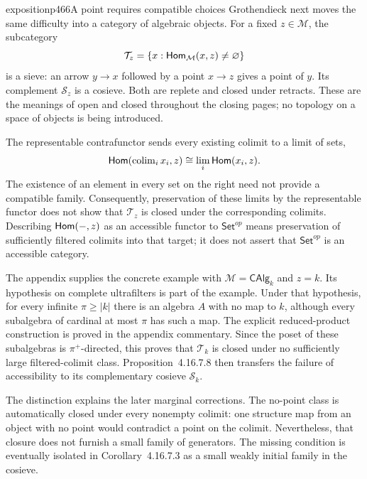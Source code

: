 \begin{dcomment}{exposition}{p466}{A point requires compatible choices}
Grothendieck next moves the same difficulty into a category of algebraic objects. For a fixed $z\in\mathcal M$, the subcategory
\[
 \mathcal T_z=\{x:\mathsf{Hom}_{\mathcal M}(x,z)\ne\varnothing\}
\]
is a sieve: an arrow $y\to x$ followed by a point $x\to z$ gives a point of $y$. Its complement $\mathcal S_z$ is a cosieve. Both are replete and closed under retracts. These are the meanings of open and closed throughout the closing pages; no topology on a space of objects is being introduced.

The representable contrafunctor sends every existing colimit to a limit of sets,
\[
 \mathsf{Hom}(\operatorname{colim}_i x_i,z)
 \cong\lim_i\mathsf{Hom}(x_i,z).
\]
The existence of an element in every set on the right need not provide a compatible family. Consequently, preservation of these limits by the representable functor does not show that $\mathcal T_z$ is closed under the corresponding colimits. Describing $\mathsf{Hom}(-,z)$ as an accessible functor to $\mathsf{Set}^{op}$ means preservation of sufficiently filtered colimits into that target; it does not assert that $\mathsf{Set}^{op}$ is an accessible category.

The appendix supplies the concrete example with $\mathcal M=\mathsf{CAlg}_k$ and $z=k$. Its hypothesis on complete ultrafilters is part of the example. Under that hypothesis, for every infinite $\pi\geq|k|$ there is an algebra $A$ with no map to $k$, although every subalgebra of cardinal at most $\pi$ has such a map. The explicit reduced-product construction is proved in the appendix commentary. Since the poset of these subalgebras is $\pi^+$-directed, this proves that $\mathcal T_k$ is closed under no sufficiently large filtered-colimit class. Proposition~4.16.7.8 then transfers the failure of accessibility to its complementary cosieve $\mathcal S_k$.

The distinction explains the later marginal corrections. The no-point class is automatically closed under every nonempty colimit: one structure map from an object with no point would contradict a point on the colimit. Nevertheless, that closure does not furnish a small family of generators. The missing condition is eventually isolated in Corollary~4.16.7.3 as a small weakly initial family in the cosieve.
\end{dcomment}


